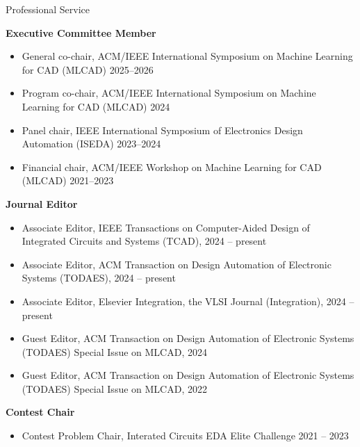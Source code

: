 
\begin{rSection}{Professional Service}

\textbf{Executive Committee Member}
\begin{itemize}
    \item General co-chair, ACM/IEEE International Symposium on Machine Learning for CAD (MLCAD) 2025--2026
    \item Program co-chair, ACM/IEEE International Symposium on Machine Learning for CAD (MLCAD) 2024
    \item Panel chair, IEEE International Symposium of Electronics Design Automation (ISEDA) 2023--2024
    \item Financial chair, ACM/IEEE Workshop on Machine Learning for CAD (MLCAD) 2021--2023 
\end{itemize}

\textbf{Journal Editor}
\begin{itemize}
    \item Associate Editor, IEEE Transactions on Computer-Aided Design of Integrated Circuits and Systems (TCAD), 2024 -- present
    \item Associate Editor, ACM Transaction on Design Automation of Electronic Systems (TODAES), 2024 -- present
    \item Associate Editor, Elsevier Integration, the VLSI Journal (Integration), 2024 -- present
    \item Guest Editor, ACM Transaction on Design Automation of Electronic Systems (TODAES) Special Issue on MLCAD, 2024
    \item Guest Editor, ACM Transaction on Design Automation of Electronic Systems (TODAES) Special Issue on MLCAD, 2022
\end{itemize}

\textbf{Contest Chair}
\begin{itemize}
    \item Contest Problem Chair, Interated Circuits EDA Elite Challenge 2021 -- 2023
\end{itemize}


\end{rSection}
